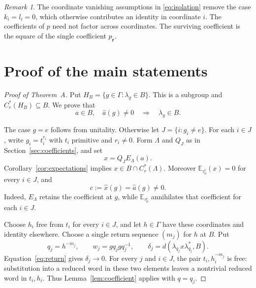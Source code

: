 \documentclass[11pt,letterpaper]{amsart}
\numberwithin{equation}{section}
\theoremstyle{definition}
\theoremstyle{remark}
\newtheorem{remark}[theorem]{Remark}
\newcommand{\Cr}{C_r^*}
\newcommand{\Etrace}[1]{\mathbb E_{\tau_0^{#1}}}
\begin{document}
\begin{remark}
The coordinate vanishing assumptions in \eqref{eq:isolation} remove
the case $k_i=l_i=0$, which otherwise contributes an identity in
coordinate $i$. The coefficients of $p$ need not factor across
coordinates. The surviving coefficient is the square of the single
coefficient $p_{\boldsymbol r}$.
\end{remark}

\section{Proof of the main statements}\label{sec:proof}

\begin{proof}[Proof of Theorem~A]
Put $H_B=\{g\in\Gamma:\lambda_g\in B\}$.
This is a subgroup and $\Cr(H_B)\subseteq B$.
We prove that
\begin{equation}\label{eq:extraction}
 a\in B,\quad \widehat a(g)\ne0
 \quad\Longrightarrow\quad \lambda_g\in B.
\end{equation}

The case $g=e$ follows from unitality.
Otherwise let $J=\{i:g_i\ne e\}$.
For each $i\in J$, write $g_i=t_i^{r_i}$ with $t_i$ primitive
and $r_i\ne0$. Form $\Lambda$ and $Q_J$ as in
Section~\ref{sec:coefficients}, and set
\begin{equation}\label{eq:centered-element}
 x=Q_JE_\Lambda(a).
\end{equation}
Corollary~\ref{cor:expectations} implies $x\in B\cap\Cr(\Lambda)$.
Moreover $\Etrace{i}(x)=0$ for every $i\in J$, and
\[
 c:=\widehat x(g)=\widehat a(g)\ne0.
\]
Indeed, $E_\Lambda$ retains the coefficient at $g$, while
$\Etrace{i}$ annihilates that coefficient for each $i\in J$.

Choose $h_i$ free from $t_i$ for every $i\in J$, and let $h\in\Gamma$
have these coordinates and identity elsewhere.
Choose a single return sequence $(m_j)$ for $h$ at $B$.
Put
\[
 q_j=h^{-m_j},\qquad
 w_j=gq_jgq_j^{-1},\qquad
 \delta_j=d(\lambda_{q_j}x\lambda_{q_j}^*,B).
\]
Equation~\eqref{eq:return} gives $\delta_j\to0$.
For every $j$ and $i\in J$, the pair $t_i,h_i^{-m_j}$ is free:
substitution into a reduced word in these two elements leaves a
nontrivial reduced word in $t_i,h_i$.
Thus Lemma~\ref{lem:coefficient} applies with $q=q_j$.


\end{proof}
\end{document}
